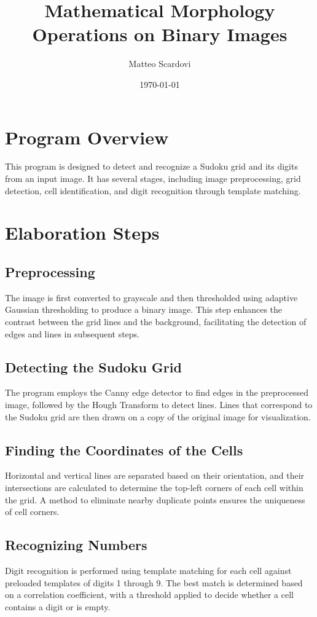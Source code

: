 \documentclass[12pt]{article}
\title{Mathematical Morphology Operations on Binary Images}
\author{Matteo Scardovi}
\date{\today}
\begin{document}
\maketitle

\section{Program Overview}
This program is designed to detect and recognize a Sudoku grid and its digits from an input image. It has several stages, including image preprocessing, grid detection, cell identification, and digit recognition through template matching.

\section{Elaboration Steps}

\subsection{Preprocessing}
The image is first converted to grayscale and then thresholded using adaptive Gaussian thresholding to produce a binary image. This step enhances the contrast between the grid lines and the background, facilitating the detection of edges and lines in subsequent steps.

\subsection{Detecting the Sudoku Grid}
The program employs the Canny edge detector to find edges in the preprocessed image, followed by the Hough Transform to detect lines. Lines that correspond to the Sudoku grid are then drawn on a copy of the original image for visualization.

\subsection{Finding the Coordinates of the Cells}
Horizontal and vertical lines are separated based on their orientation, and their intersections are calculated to determine the top-left corners of each cell within the grid. A method to eliminate nearby duplicate points ensures the uniqueness of cell corners.

\subsection{Recognizing Numbers}
Digit recognition is performed using template matching for each cell against preloaded templates of digits 1 through 9. The best match is determined based on a correlation coefficient, with a threshold applied to decide whether a cell contains a digit or is empty.
\end{document}
